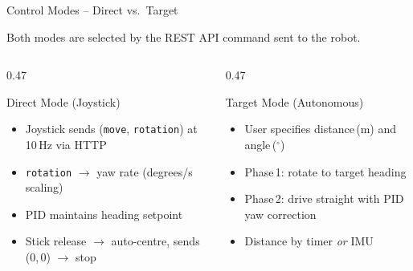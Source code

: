 \documentclass[aspectratio=169, 11pt]{beamer}
\begin{document}

\begin{frame}{Control Modes – Direct vs.\ Target}

  \centering
  {\small Both modes are selected by the REST API command sent to the robot.}

  \bigskip
  \begin{columns}[T]
    \begin{column}{0.47\textwidth}
      \begin{block}{\centering Direct Mode (Joystick)}
        \begin{itemize}
          \item Joystick sends (\texttt{move}, \texttt{rotation})
                at 10\,Hz via HTTP
          \item \texttt{rotation} $\rightarrow$ yaw rate
                (degrees/s scaling)
          \item PID maintains heading setpoint
          \item Stick release $\rightarrow$ auto-centre,
                sends (0,\,0) $\rightarrow$ stop
        \end{itemize}
      \end{block}
    \end{column}

    \begin{column}{0.47\textwidth}
      \begin{block}{\centering Target Mode (Autonomous)}
        \begin{itemize}
          \item User specifies distance\,(m)
                and angle\,($^\circ$)
          \item Phase\,1: rotate to target heading
          \item Phase\,2: drive straight with
                PID yaw correction
          \item Distance by timer \emph{or} IMU
        \end{itemize}
      \end{block}
    \end{column}
  \end{columns}
\end{frame}
\end{document}

